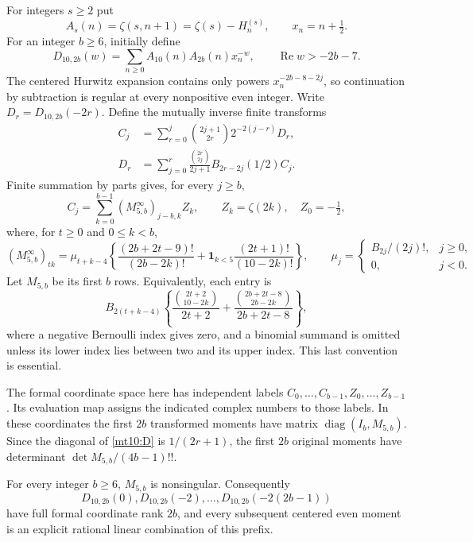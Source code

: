 For integers $s\ge2$ put
\[
 A_s(n)=\zeta(s,n+1)=\zeta(s)-H_n^{(s)},\qquad x_n=n+\tfrac12.
\]
For an integer $b\ge6$, initially define
\[
 D_{10,2b}(w)=\sum_{n\ge0}A_{10}(n)A_{2b}(n)x_n^{-w},
 \qquad \operatorname{Re}w>-2b-7.
\]
The centered Hurwitz expansion contains only powers
$x_n^{-2b-8-2j}$, so continuation by subtraction is regular at every
nonpositive even integer. Write $D_r=D_{10,2b}(-2r)$. Define the
mutually inverse finite transforms
\begin{align}
 C_j&=\sum_{r=0}^j\binom{2j+1}{2r}2^{-2(j-r)}D_r,
 \label{mt10:C}\\
 D_r&=\sum_{j=0}^r\frac{\binom{2r}{2j}}{2j+1}
                 B_{2r-2j}(1/2)C_j.\label{mt10:D}
\end{align}
Finite summation by parts gives, for every $j\ge b$,
\[
 C_j=\sum_{k=0}^{b-1}(M^{\infty}_{5,b})_{j-b,k}Z_k,
 \qquad Z_k=\zeta(2k),\quad Z_0=-\tfrac12,
\]
where, for $t\ge0$ and $0\le k<b$,
\begin{equation}\label{mt10:M}
 (M^{\infty}_{5,b})_{tk}
 =\mu_{t+k-4}\left\{
 \frac{(2b+2t-9)!}{(2b-2k)!}
 +\mathbf1_{k<5}\frac{(2t+1)!}{(10-2k)!}\right\},
 \qquad
 \mu_j=\begin{cases}B_{2j}/(2j)!,&j\ge0,\\0,&j<0.\end{cases}
\end{equation}
Let $M_{5,b}$ be its first $b$ rows. Equivalently, each entry is
\[
 B_{2(t+k-4)}\left\{
 \frac{\binom{2t+2}{10-2k}}{2t+2}
 +\frac{\binom{2b+2t-8}{2b-2k}}{2b+2t-8}\right\},
\]
where a negative Bernoulli index gives zero, and a binomial summand
is omitted unless its lower index lies between two and its upper
index. This last convention is essential.

The formal coordinate space here has independent labels
$C_0,\ldots,C_{b-1},Z_0,\ldots,Z_{b-1}$. Its evaluation map assigns
the indicated complex numbers to those labels. In these coordinates
the first $2b$ transformed moments have matrix
$\operatorname{diag}(I_b,M_{5,b})$. Since the diagonal of
\eqref{mt10:D} is $1/(2r+1)$, the first $2b$ original moments have
determinant $\det M_{5,b}/(4b-1)!!$.

\begin{theorem}
\label{mt10:main}
For every integer $b\ge6$, $M_{5,b}$ is nonsingular. Consequently
\[
 D_{10,2b}(0),D_{10,2b}(-2),\ldots,D_{10,2b}(-2(2b-1))
\]
have full formal coordinate rank $2b$, and every subsequent centered
even moment is an explicit rational linear combination of this prefix.
\end{theorem}

